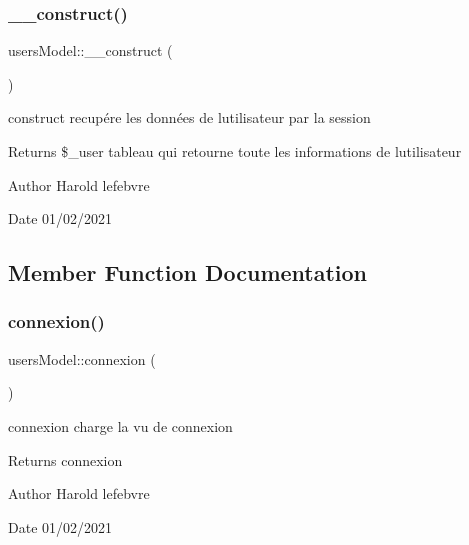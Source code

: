 \subsubsection{\texorpdfstring{\+\_\+\+\_\+construct()}{\_\_construct()}}
{\footnotesize\ttfamily users\+Model\+::\+\_\+\+\_\+construct (\begin{DoxyParamCaption}{ }\end{DoxyParamCaption})}



construct recupére les données de l\textquotesingle{}utilisateur par la session 

\begin{DoxyReturn}{Returns}
\$\+\_\+user tableau qui retourne toute les informations de l\textquotesingle{}utilisateur 
\end{DoxyReturn}
\begin{DoxyAuthor}{Author}
Harold lefebvre 
\end{DoxyAuthor}
\begin{DoxyDate}{Date}
01/02/2021 
\end{DoxyDate}


\subsection{Member Function Documentation}
\mbox{\label{classusers_model_ae77247bdc2a5a49190b4877516515031}} 
\subsubsection{\texorpdfstring{connexion()}{connexion()}}
{\footnotesize\ttfamily users\+Model\+::connexion (\begin{DoxyParamCaption}{ }\end{DoxyParamCaption})}



connexion charge la vu de connexion 

\begin{DoxyReturn}{Returns}
connexion 
\end{DoxyReturn}
\begin{DoxyAuthor}{Author}
Harold lefebvre 
\end{DoxyAuthor}
\begin{DoxyDate}{Date}
01/02/2021 
\end{DoxyDate}
\mbox{\label{classusers_model_a36138824d4c6ecdcd626fa1bac2c7335}} 
